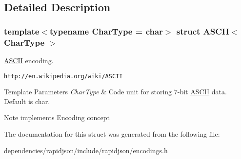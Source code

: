 \subsection{Detailed Description}
\subsubsection*{template$<$typename Char\+Type = char$>$\newline
struct A\+S\+C\+I\+I$<$ Char\+Type $>$}

\hyperlink{struct_a_s_c_i_i}{A\+S\+C\+II} encoding. 

\href{http://en.wikipedia.org/wiki/ASCII}{\tt http\+://en.\+wikipedia.\+org/wiki/\+A\+S\+C\+II} 
\begin{DoxyTemplParams}{Template Parameters}
{\em Char\+Type} & Code unit for storing 7-\/bit \hyperlink{struct_a_s_c_i_i}{A\+S\+C\+II} data. Default is char. \\
\hline
\end{DoxyTemplParams}
\begin{DoxyNote}{Note}
implements Encoding concept 
\end{DoxyNote}


The documentation for this struct was generated from the following file\+:\begin{DoxyCompactItemize}
\item 
dependencies/rapidjson/include/rapidjson/encodings.\+h\end{DoxyCompactItemize}
